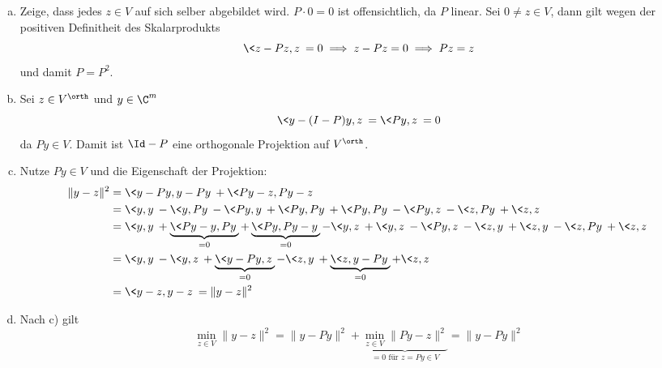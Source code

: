 \documentclass{mywork}
\begin{document}
\newpage
\begin{aufgabe}
	\begin{enumerate}[a)]
		\item
			Zeige, dass jedes $z\in V$ auf sich selber abgebildet wird.
			$P\cdot 0 = 0$ ist offensichtlich, da $P$ linear.
			Sei $0\neq z \in V$, dann gilt wegen der positiven Definitheit des Skalarprodukts
			\[
				\<z-Pz,z\> = 0 \implies z-Pz = 0 \implies Pz=z
			\]
			und damit $P=P^2$.
		\item
			Sei $z\in V^\orth$ und $y\in \C^m$
			\[
				\<y-(I-P)y,z\> = \<Py,z\> = 0
			\]
			da $Py \in V$.
			Damit ist $\Id - P$ eine orthogonale Projektion auf $V^\orth$.
		\item
			Nutze $Py\in V$ und die Eigenschaft der Projektion:
			\begin{align*}
				\|y-z\|^2
				&=\<y-Py,y-Py\> + \<Py-z,Py-z\> \\
				&= \<y,y\> - \<y,Py\> - \<Py,y\> + \<Py,Py\> + \<Py,Py\> - \<Py,z\> - \<z,Py\> + \<z,z\>\\
				&= \<y,y\> + \underbrace{\<Py-y,Py\>}_{=0} + \underbrace{\<Py,Py-y\>}_{=0} -\<y,z\> + \<y,z\> - \<Py,z\> - \<z,y\>+\<z,y\> - \<z,Py\> + \<z,z\>\\
				&= \<y,y\> - \<y,z\> + \underbrace{\<y-Py,z\>}_{=0} - \<z,y\> + \underbrace{\<z,y-Py\>}_{=0} + \<z,z\> \\
				&= \<y-z,y-z\> = \|y-z\|^2
			\end{align*}
		\item
			Nach c) gilt
			\[
				\min_{z\in V} \|y-z\|^2 = \|y-Py\|^2 + \underbrace{\min_{z\in V}\|Py-z\|^2}_{=0 \text{ für $z=Py\in V$}} = \|y-Py\|^2
			\]
	\end{enumerate}
\end{aufgabe}
\end{document}
